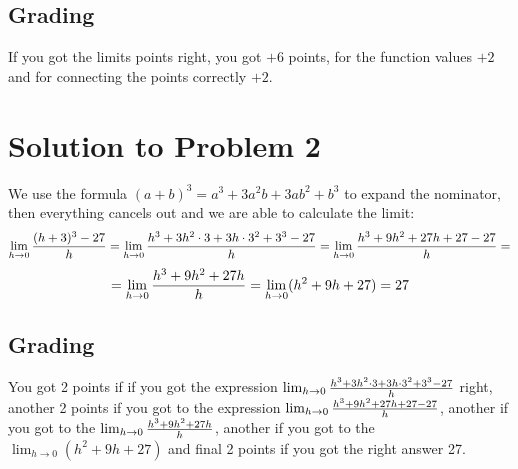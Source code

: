 \documentclass[10pt]{article}
\begin{document}
\subsection*{Grading}

If you got the limits points right, you got $+6$ points, for the function
values $+2$ and for connecting the points correctly $+2$.

\section*{Solution to Problem 2}

We use the formula $(a+b)^3 = a^3+3a^2b+3ab^2+b^3$ to expand the nominator,
then everything cancels out and we are able to calculate the limit:
$$
\lim_{h\to0}{(h+3)^3-27\over h}
=\lim_{h\to0}{h^3+3h^2\cdot3+3h\cdot3^2+3^3-27\over h}
=\lim_{h\to0}{h^3+9h^2+27h+27-27\over h}
=
$$
$$
=\lim_{h\to0}{h^3+9h^2+27h\over h}
=\lim_{h\to0}(h^2+9h+27)
=27
$$

\subsection*{Grading}

You got 2 points if if you got the expression $\lim_{h\to0}{h^3+3h^2\cdot3+3h\cdot3^2+3^3-27\over
h}$ right, another 2 points if you got to the expression
$\lim_{h\to0}{h^3+9h^2+27h+27-27\over h}$, another if you got to the
$\lim_{h\to0}{h^3+9h^2+27h\over h}$, another if you got to the
$\lim_{h\to0}(h^2+9h+27)$ and final 2 points if you got the right answer 27.
\end{document}

